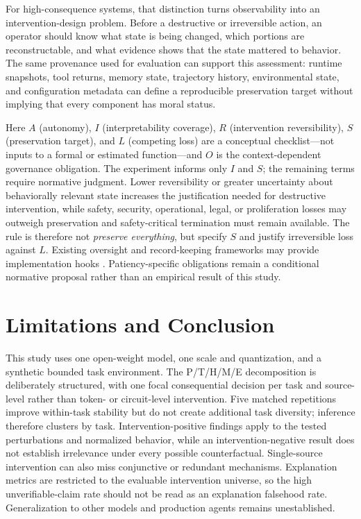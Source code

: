 \documentclass[conference]{IEEEtran}
\begin{document}
For high-consequence systems, that distinction turns observability into an intervention-design problem. Before a destructive or irreversible action, an operator should know what state is being changed, which portions are reconstructable, and what evidence shows that the state mattered to behavior. The same provenance used for evaluation can support this assessment: runtime snapshots, tool returns, memory state, trajectory history, environmental state, and configuration metadata can define a reproducible preservation target without implying that every component has moral status.

Here $A$ (autonomy), $I$ (interpretability coverage), $R$ (intervention reversibility), $S$ (preservation target), and $L$ (competing loss) are a conceptual checklist---not inputs to a formal or estimated function---and $O$ is the context-dependent governance obligation. The experiment informs only $I$ and $S$; the remaining terms require normative judgment. Lower reversibility or greater uncertainty about behaviorally relevant state increases the justification needed for destructive intervention, while safety, security, operational, legal, or proliferation losses may outweigh preservation and safety-critical termination must remain available. The rule is therefore not \textit{preserve everything}, but specify $S$ and justify irreversible loss against $L$. Existing oversight and record-keeping frameworks may provide implementation hooks \cite{b18,b19}. Patiency-specific obligations remain a conditional normative proposal rather than an empirical result of this study.


\section{Limitations and Conclusion}
This study uses one open-weight model, one scale and quantization, and a synthetic bounded task environment. The P/T/H/M/E decomposition is deliberately structured, with one focal consequential decision per task and source-level rather than token- or circuit-level intervention. Five matched repetitions improve within-task stability but do not create additional task diversity; inference therefore clusters by task. Intervention-positive findings apply to the tested perturbations and normalized behavior, while an intervention-negative result does not establish irrelevance under every possible counterfactual. Single-source intervention can also miss conjunctive or redundant mechanisms. Explanation metrics are restricted to the evaluable intervention universe, so the high unverifiable-claim rate should not be read as an explanation falsehood rate. Generalization to other models and production agents remains unestablished.
\end{document}
